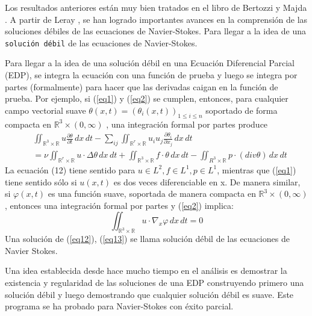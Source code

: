 Los resultados anteriores están muy bien tratados en el libro de Bertozzi y Majda \cite{majda2002vorticity}. A partir de Leray \cite{leray1934mouvement}, se han logrado importantes avances en la comprensión de las soluciones débiles de las ecuaciones de Navier-Stokes. Para llegar a la idea de una \texttt{solución débil} de las ecuaciones de Navier-Stokes.

Para llegar a la idea de una solución débil en una Ecuación Diferencial Parcial (EDP), se integra la ecuación con una función de prueba y luego se integra por partes (formalmente) para hacer que las derivadas caigan en la función de prueba. Por ejemplo, si (\ref{eq1}) y (\ref{eq2}) se cumplen, entonces, para cualquier campo vectorial suave $\theta(x, t) = \left(\theta_i(x, t)\right)_{1\leq i\leq n}$ soportado de forma compacta en $\mathbb{R}^3 \times (0,\infty)$ , una integración formal por partes produce
\begin{equation}
\begin{split}
    &\iint_{\mathbb{R}^3\times \mathbb{R}}u \frac{\partial \theta}{\partial t}\,dx\,dt - \sum_{ij} \iint_{\mathbb{R}^r\times \mathbb{R}}u_i u_j \frac{\partial \theta_i}{\partial x_j} \,dx\,dt\\
    &=\nu \iint_{\mathbb{R}^r\times \mathbb{R}} u \cdot \Delta \theta\,dx\,dt + \iint_{\mathbb{R}^3\times \mathbb{R}} f \cdot \theta \,dx\,dt - \iint_{R^3\times \mathbb{R}}p \cdot \left(div\theta\right)\,dx\,dt
    \label{eq12}
\end{split}
\end{equation}
La ecuación (12) tiene sentido para $u\in L^2, f\in L^1, p\in L^1$, mientras que (\ref{eq1}) tiene sentido sólo si $u(x, t)$ es dos veces diferenciable en x. De manera similar, si $\varphi (x, t)$ es una función suave, soportada de manera compacta en $\mathbb{R}^3 \times (0,\infty)$, entonces una integración formal por partes y (\ref{eq2}) implica:
\begin{equation}
    \iint_{\mathbb{R}^3\times \mathbb{R}} u \cdot \nabla_x \varphi \,dx\,dt = 0
    \label{eq13}
\end{equation}
Una solución de (\ref{eq12}), (\ref{eq13}) se llama solución débil de las ecuaciones de Navier Stokes.

Una idea establecida desde hace mucho tiempo en el análisis es demostrar la existencia y regularidad de las soluciones de una EDP construyendo primero una solución débil y luego demostrando que cualquier solución débil es suave. Este programa se ha probado para Navier-Stokes con éxito parcial.

